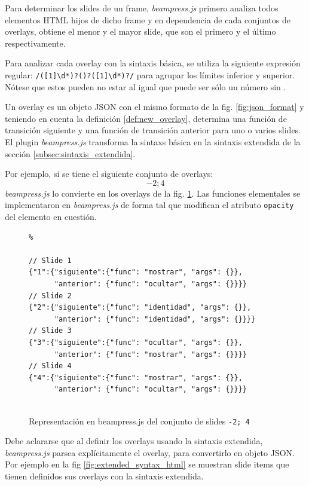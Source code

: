 			Para determinar los slides de un frame, \textit{beampress.js} primero analiza todos elementos HTML hijos de dicho frame y en dependencia de cada conjuntos de overlays, obtiene el menor y el mayor slide, que son el primero y el último respectivamente.

			Para analizar cada overlay con la sintaxis básica, se utiliza la siguiente expresión regular: \texttt{/([1]\textbackslash d*)?(\textendash )?([1]\textbackslash d*)?/} para agrupar los límites inferior y superior. Nótese que estos pueden no estar al igual que puede ser sólo un número sin \texttt{\textendash}. 

			Un overlay es un objeto JSON con el mismo formato de la fig. \ref{fig:json_format} y teniendo en cuenta la definición \ref{def:new_overlay}, determina una función de transición siguiente y una función de transición anterior para uno o varios slides. El plugin \textit{beampress.js} transforma la sintaxs básica en la sintaxis extendida de la sección \ref{subsec:sintaxis_extendida}. 

			Por ejemplo, si se tiene el siguiente conjunto de overlays: $$-2; 4$$ \textit{beampress.js} lo convierte en los overlays de la fig. \ref{fig:overlay_set_beampress}. Las funciones elementales se implementaron en \textit{beampress.js} de forma tal que modifican el atributo \texttt{opacity} del elemento en cuestión.

				\begin{figure}[htb]%
					\begin{lstlisting}%

// Slide 1
{"1":{"siguiente":{"func": "mostrar", "args": {}},
      "anterior": {"func": "ocultar", "args": {}}}} 
// Slide 2
{"2":{"siguiente":{"func": "identidad", "args": {}},
      "anterior": {"func": "identidad", "args": {}}}}  
// Slide 3
{"3":{"siguiente":{"func": "ocultar", "args": {}},
      "anterior": {"func": "mostrar", "args": {}}}}  
// Slide 4
{"4":{"siguiente":{"func": "mostrar", "args": {}},
      "anterior": {"func": "ocultar", "args": {}}}}                                       				
	
					\end{lstlisting}
					\caption{Representación en beampress.js del conjunto de slides \texttt{-2; 4}}
					\label{fig:overlay_set_beampress}
				\end{figure}			
					
		
			
			Debe aclararse que al definir los overlays usando la sintaxis extendida, \textit{beampress.js} parsea explícitamente el overlay, para convertirlo en objeto JSON. Por ejemplo en la fig \ref{fig:extended_syntax_html} se muestran slide items que tienen definidos sus overlays con la sintaxis extendida.

